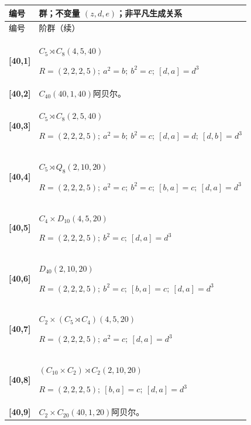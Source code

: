\documentclass[UTF8,fontset=fandol,11pt,a4paper]{ctexart}
\begin{document}
\begin{longtable}{@{}p{17mm}>{\raggedright\arraybackslash}p{141mm}@{}}

\toprule 编号 & 群；不变量 $(z,d,e)$；非平凡生成关系\\\midrule\endfirsthead

\toprule 编号 & 40 阶群（续）\\\midrule\endhead\bottomrule\endfoot

\textbf{[40,1]} & $C_{5}\rtimes C_{8}$\quad $(4,5,40)$\par\(R=(2,2,2,5);\allowbreak\ a^{2}=b;\allowbreak\ b^{2}=c;\allowbreak\ [d,a]=d^{3}\)\\[3pt]

\textbf{[40,2]} & $C_{40}$\quad $(40,1,40)$\quad 阿贝尔。\\[3pt]

\textbf{[40,3]} & $C_{5}\rtimes C_{8}$\quad $(2,5,40)$\par\(R=(2,2,2,5);\allowbreak\ a^{2}=b;\allowbreak\ b^{2}=c;\allowbreak\ [d,a]=d;\allowbreak\ [d,b]=d^{3}\)\\[3pt]

\textbf{[40,4]} & $C_{5}\rtimes Q_{8}$\quad $(2,10,20)$\par\(R=(2,2,2,5);\allowbreak\ a^{2}=c;\allowbreak\ b^{2}=c;\allowbreak\ [b,a]=c;\allowbreak\ [d,a]=d^{3}\)\\[3pt]

\textbf{[40,5]} & $C_{4}\times D_{10}$\quad $(4,5,20)$\par\(R=(2,2,2,5);\allowbreak\ b^{2}=c;\allowbreak\ [d,a]=d^{3}\)\\[3pt]

\textbf{[40,6]} & $D_{40}$\quad $(2,10,20)$\par\(R=(2,2,2,5);\allowbreak\ b^{2}=c;\allowbreak\ [b,a]=c;\allowbreak\ [d,a]=d^{3}\)\\[3pt]

\textbf{[40,7]} & $C_{2}\times (C_{5}\rtimes C_{4})$\quad $(4,5,20)$\par\(R=(2,2,2,5);\allowbreak\ a^{2}=c;\allowbreak\ [d,a]=d^{3}\)\\[3pt]

\textbf{[40,8]} & $(C_{10}\times C_{2})\rtimes C_{2}$\quad $(2,10,20)$\par\(R=(2,2,2,5);\allowbreak\ [b,a]=c;\allowbreak\ [d,a]=d^{3}\)\\[3pt]

\textbf{[40,9]} & $C_{2}\times C_{20}$\quad $(40,1,20)$\quad 阿贝尔。\\[3pt]


\end{longtable}
\end{document}
